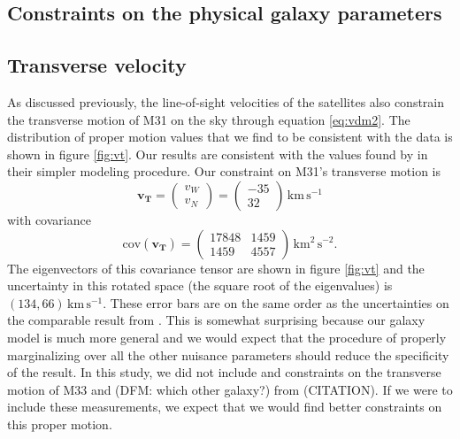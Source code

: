 \documentclass[preprint]{aastex}
\newcommand{\fig}[1]{figure \ref{fig:#1}}
\newcommand{\eq}[1]{equation \ref{eq:#1}}
\newcommand{\bvec}[1]{\ensuremath{\boldsymbol{#1}}}
\newcommand{\unit}[1]{\,\mathrm{#1}}
\newcommand{\kms}{\unit{km\,s^{-1}}}
\begin{document}
\subsection{Constraints on the physical galaxy parameters}



\subsection{Transverse velocity}

As discussed previously, the line-of-sight velocities of the satellites also
constrain the transverse motion of M31 on the sky through \eq{vdm2}. The
distribution of proper motion values that we find to be consistent with the
data is shown in \fig{vt}. Our results are consistent with the values found
by \citet{vdm} in their simpler modeling procedure. Our constraint on
M31's transverse motion is
\begin{equation}
    \bvec{v_T} =
    \left ( \begin{array}{c}
        v_W \\ v_N
    \end{array} \right ) =
    \left ( \begin{array}{c}
        -35 \\ 32
    \end{array} \right ) \kms
\end{equation}
with covariance
\begin{equation}
    \mathrm{cov} (\bvec{v_T}) = \left ( \begin{array}{cc}
        17848 & 1459 \\
        1459  & 4557
    \end{array}\right ) \unit{km^2\, s^{-2}}.
\end{equation}
The eigenvectors of this covariance tensor are shown in \fig{vt} and the
uncertainty in this rotated space (the square root of the eigenvalues) is
$(134, 66) \kms$. These error bars are on the same order as the
uncertainties on the comparable result from \citet{vdm}. This is somewhat
surprising because our galaxy model is much more general and we
would expect that the procedure of properly marginalizing over all the
other nuisance parameters should reduce the specificity of the result.
In this study, we did not include and constraints on the transverse motion
of M33 and (DFM: which other galaxy?) from (CITATION). If we were to include
these measurements, we expect that we would find better constraints on this
proper motion.
\end{document}
